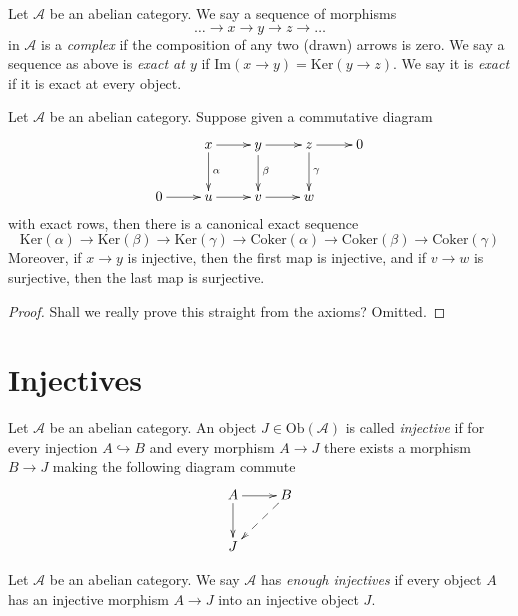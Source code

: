 \begin{definition}
\label{definition-exact}
Let $\mathcal{A}$ be an abelian category.
We say a sequence of morphisms
$$
\ldots \to x \to y \to z \to \ldots
$$
in $\mathcal{A}$
is a {\it complex} if the composition of any two (drawn)
arrows is zero. We say a sequence as above is {\it exact at $y$} if
$\text{Im}(x \to y) = \text{Ker}(y \to z)$. We say it is {\it exact}
if it is exact at every object.
\end{definition}

\begin{lemma}
\label{lemma-snake}
Let $\mathcal{A}$ be an abelian category.
Suppose given a commutative diagram
$$
\xymatrix{
& x \ar[r] \ar[d]^\alpha &
y \ar[r] \ar[d]^\beta &
z \ar[r] \ar[d]^\gamma &
0 \\
0 \ar[r] & u \ar[r] & v \ar[r] & w
}
$$
with exact rows, then there is a canonical exact sequence
$$
\text{Ker}(\alpha) \to \text{Ker}(\beta) \to \text{Ker}(\gamma)
\to
\text{Coker}(\alpha) \to \text{Coker}(\beta) \to \text{Coker}(\gamma)
$$
Moreover, if $x \to y$ is injective, then the first map is
injective, and if $v \to w$ is surjective, then the last
map is surjective.
\end{lemma}

\begin{proof}
Shall we really prove this straight from the
axioms? Omitted.
\end{proof}


\section{Injectives}
\label{section-injectives}

\begin{definition}
\label{definition-injective}
Let $\mathcal{A}$ be an abelian category.
An object $J \in \text{Ob}(\mathcal{A})$ is
called {\it injective} if for every injection
$A \hookrightarrow B$ and every morphism
$A \to J$ there exists a morphism $B \to J$ making
the following diagram commute
$$
\xymatrix{
A \ar[r] \ar[d] & B \ar@{-->}[ld] \\
J & 
}
$$
\end{definition}

\begin{definition}
\label{definition-enough-injectives}
Let $\mathcal{A}$ be an abelian category.
We say $\mathcal{A}$ has {\it enough injectives}
if every object $A$ has an injective morphism
$A \to J$ into an injective object $J$.
\end{definition}

